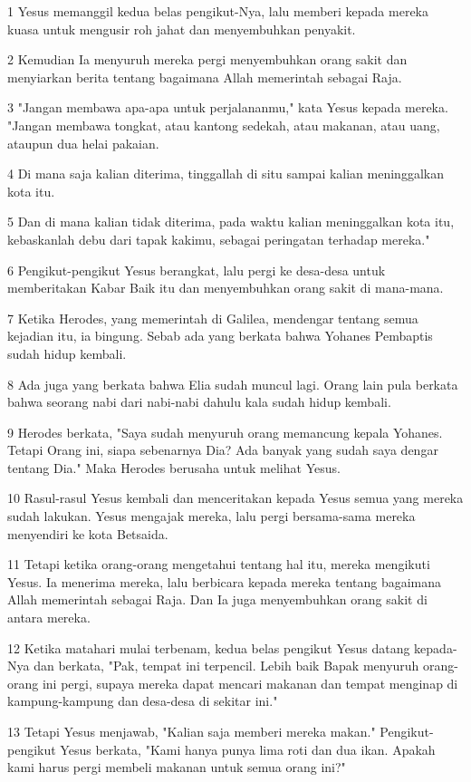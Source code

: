 \par 1 Yesus memanggil kedua belas pengikut-Nya, lalu memberi kepada mereka kuasa untuk mengusir roh jahat dan menyembuhkan penyakit.
\par 2 Kemudian Ia menyuruh mereka pergi menyembuhkan orang sakit dan menyiarkan berita tentang bagaimana Allah memerintah sebagai Raja.
\par 3 "Jangan membawa apa-apa untuk perjalananmu," kata Yesus kepada mereka. "Jangan membawa tongkat, atau kantong sedekah, atau makanan, atau uang, ataupun dua helai pakaian.
\par 4 Di mana saja kalian diterima, tinggallah di situ sampai kalian meninggalkan kota itu.
\par 5 Dan di mana kalian tidak diterima, pada waktu kalian meninggalkan kota itu, kebaskanlah debu dari tapak kakimu, sebagai peringatan terhadap mereka."
\par 6 Pengikut-pengikut Yesus berangkat, lalu pergi ke desa-desa untuk memberitakan Kabar Baik itu dan menyembuhkan orang sakit di mana-mana.
\par 7 Ketika Herodes, yang memerintah di Galilea, mendengar tentang semua kejadian itu, ia bingung. Sebab ada yang berkata bahwa Yohanes Pembaptis sudah hidup kembali.
\par 8 Ada juga yang berkata bahwa Elia sudah muncul lagi. Orang lain pula berkata bahwa seorang nabi dari nabi-nabi dahulu kala sudah hidup kembali.
\par 9 Herodes berkata, "Saya sudah menyuruh orang memancung kepala Yohanes. Tetapi Orang ini, siapa sebenarnya Dia? Ada banyak yang sudah saya dengar tentang Dia." Maka Herodes berusaha untuk melihat Yesus.
\par 10 Rasul-rasul Yesus kembali dan menceritakan kepada Yesus semua yang mereka sudah lakukan. Yesus mengajak mereka, lalu pergi bersama-sama mereka menyendiri ke kota Betsaida.
\par 11 Tetapi ketika orang-orang mengetahui tentang hal itu, mereka mengikuti Yesus. Ia menerima mereka, lalu berbicara kepada mereka tentang bagaimana Allah memerintah sebagai Raja. Dan Ia juga menyembuhkan orang sakit di antara mereka.
\par 12 Ketika matahari mulai terbenam, kedua belas pengikut Yesus datang kepada-Nya dan berkata, "Pak, tempat ini terpencil. Lebih baik Bapak menyuruh orang-orang ini pergi, supaya mereka dapat mencari makanan dan tempat menginap di kampung-kampung dan desa-desa di sekitar ini."
\par 13 Tetapi Yesus menjawab, "Kalian saja memberi mereka makan." Pengikut-pengikut Yesus berkata, "Kami hanya punya lima roti dan dua ikan. Apakah kami harus pergi membeli makanan untuk semua orang ini?"
